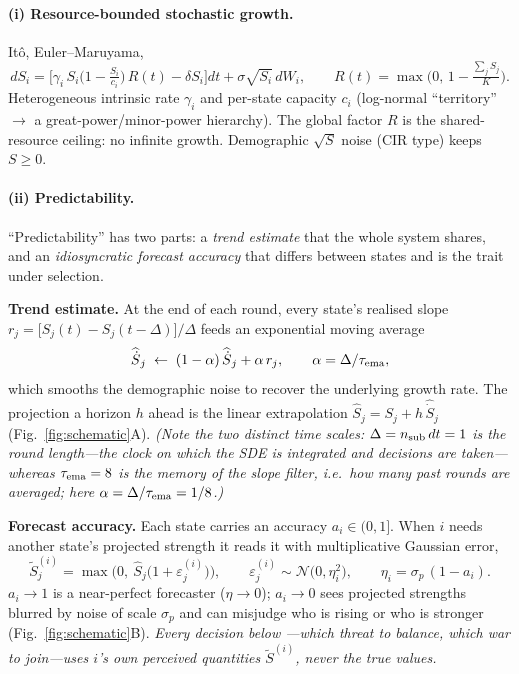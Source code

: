 \documentclass[11pt]{article}
\begin{document}
\paragraph{(i) Resource-bounded stochastic growth.} It\^o, Euler--Maruyama,
\begin{equation}
dS_i=\Big[\gamma_i\,S_i\big(1-\tfrac{S_i}{c_i}\big)\,R(t)-\delta S_i\Big]dt
      +\sigma\sqrt{S_i}\,dW_i,\qquad
R(t)=\max\!\Big(0,\,1-\tfrac{\sum_j S_j}{K}\Big).
\end{equation}
Heterogeneous intrinsic rate $\gamma_i$ and per-state capacity $c_i$ (log-normal
``territory'' $\to$ a great-power/minor-power hierarchy). The global factor $R$ is
the shared-resource ceiling: no infinite growth. Demographic $\sqrt{S}$ noise
(CIR type) keeps $S\ge 0$.

\paragraph{(ii) Predictability.} ``Predictability'' has two parts: a
\emph{trend estimate} that the whole system shares, and an \emph{idiosyncratic
forecast accuracy} that differs between states and is the trait under selection.

\textbf{Trend estimate.} At the end of each round, every state's realised slope
$r_j=\big[S_j(t)-S_j(t-\Delta)\big]/\Delta$ feeds an exponential moving average
\begin{equation}
\widehat{\dot S}_j \;\leftarrow\; (1-\alpha)\,\widehat{\dot S}_j+\alpha\,r_j,
\qquad \alpha=\Delta/\tau_{\rm ema},
\end{equation}
which smooths the demographic noise to recover the underlying growth rate. The
projection a horizon $h$ ahead is the linear extrapolation
$\hat S_j=S_j+h\,\widehat{\dot S}_j$ (Fig.~\ref{fig:schematic}A). \emph{(Note the
two distinct time scales: $\Delta=n_{\rm sub}\,dt=1$ is the round length---the
clock on which the SDE is integrated and decisions are taken---whereas
$\tau_{\rm ema}=8$ is the memory of the slope filter, i.e.\ how many past rounds
are averaged; here $\alpha=\Delta/\tau_{\rm ema}=1/8$.)}

\textbf{Forecast accuracy.} Each state carries an accuracy $a_i\in(0,1]$. When $i$
needs another state's projected strength it reads it with multiplicative
Gaussian error,
\begin{equation}
\tilde S^{(i)}_j=\max\!\Big(0,\ \hat S_j\big(1+\varepsilon^{(i)}_j\big)\Big),
\qquad \varepsilon^{(i)}_j\sim\mathcal{N}\!\big(0,\eta_i^2\big),
\qquad \eta_i=\sigma_p\,(1-a_i).
\end{equation}
$a_i\!\to\!1$ is a near-perfect forecaster ($\eta\!\to\!0$); $a_i\!\to\!0$ sees
projected strengths blurred by noise of scale $\sigma_p$ and can misjudge who is
rising or who is stronger (Fig.~\ref{fig:schematic}B). \emph{Every decision below
---which threat to balance, which war to join---uses $i$'s own perceived
quantities $\tilde S^{(i)}$, never the true values.}
\end{document}
